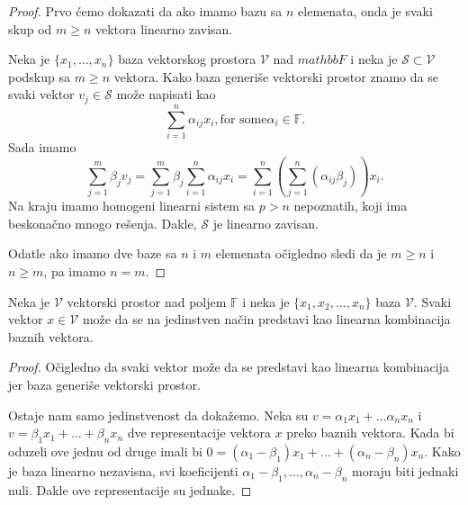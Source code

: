 \documentclass{article}
\begin{document}
\begin{proof}
  Prvo ćemo dokazati da ako imamo bazu sa $n$ elemenata, onda je svaki skup od $m \ge n$ vektora linearno zavisan.
  
  Neka je $\{x_1, \ldots, x_n\}$ baza vektorskog prostora $\mathcal{V}$ nad $mathbb{F}$ i neka je $\mathcal{S} \subset \mathcal{V}$ podskup sa $m \ge n$ vektora.
  Kako baza generiše vektorski prostor znamo da se svaki vektor $v_j \in \mathcal{S}$ može napisati kao
  \[\sum_{i = 1}^{n} \alpha_{ij} x_i, \text{for some} \alpha_i \in \mathbb{F}.\]
  Sada imamo
  \[\sum_{j = 1}^{m} \beta_j v_j = \sum_{j = 1}^{m} \beta_j \sum_{i = 1}^{n} \alpha_{ij} x_i = \sum_{i = 1}^{n} (\sum_{j = 1}^{n} (\alpha_{ij} \beta_j)) x_i.\]
  Na kraju imamo homogeni linearni sistem sa $p > n$ nepoznatih, koji ima beskonačno mnogo rešenja.
  Dakle, $\mathcal{S}$ je linearno zavisan.

  Odatle ako imamo dve baze sa $n$ i $m$ elemenata očigledno sledi da je $m \ge n$ i $n \ge m$, pa imamo $n = m$.
\end{proof}

\begin{theorem}
  Neka je $\mathcal{V}$ vektorski prostor nad poljem $\mathbb{F}$ i neka je $\{x_1, x_2, \ldots, x_n\}$ baza $\mathcal{V}$.
  Svaki vektor $x \in \mathcal{V}$ može da se na jedinstven način predstavi kao linearna kombinacija baznih vektora.
\end{theorem}

\begin{proof}
  Očigledno da svaki vektor može da se predstavi kao linearna kombinacija jer baza generiše vektorski prostor.

  Ostaje nam samo jedinstvenost da dokažemo.
  Neka su $v = \alpha_1 x_1 + \ldots \alpha_n x_n$ i $ v = \beta_1 x_1 + \ldots + \beta_n x_n$ dve representacije vektora $x$ preko baznih vektora.
  Kada bi oduzeli ove jednu od druge imali bi $0 = (\alpha_1 - \beta_1) x_1 + \ldots + (\alpha_n - \beta_n) x_n$.
  Kako je baza linearno nezavisna, svi koeficijenti $\alpha_1 - \beta_1, \ldots, \alpha_n - \beta_n$ moraju biti jednaki nuli.
  Dakle ove representacije su jednake.
\end{proof}
\end{document}

